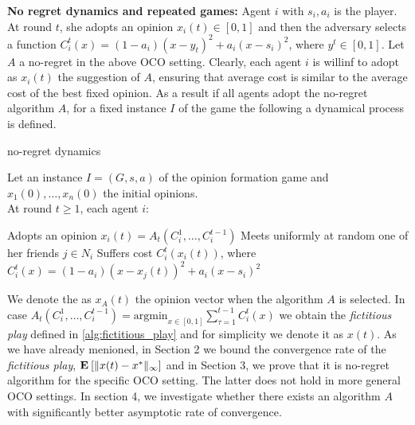 \noindent \textbf{No regret dynamics and repeated games:}
\noindent Agent $i$ with $s_i,a_i$ is the player. At round $t$, she adopts an opinion $x_i(t) \in [0,1]$ and then the adversary selects a function $C_i^t(x)=(1-a_i)(x-y_t)^2 + a_i(x-s_i)^2$, where $y^t\in [0,1]$.
Let $A$ a no-regret in the above OCO setting. Clearly, each agent $i$ is willinf to adopt as $x_i(t)$ the suggestion of $A$, ensuring that average cost is similar
to the average cost of the best fixed opinion. As a result if all agents adopt the no-regret algorithm $A$, for a fixed instance $I$ of the game the following a dynamical process
is defined.
\begin{algorithm}
  \caption{no-regret dynamics}
  \label{alg:fno_regret_dynamics}
      Let an instance $I=(G,s,a)$ of the opinion formation game and $x_1(0),\ldots,x_n(0)$ the initial opinions.\\
      At round $t\geq 1$, each agent $i$:
  \begin{algorithmic}[1]
    \State Adopts an opinion $x_i(t)=A_t(C_i^1,\ldots,C_i^{t-1})$
    \State Meets uniformly at random one of her friends $j \in N_i$
    \State Suffers cost $C^t_i(x_i(t))$, where $C^t_i(x) = (1-a_i)(x-x_j(t))^2 + a_i(x-s_i)^2$
\end{algorithmic}
\end{algorithm}

\noindent We denote the as $x_A(t)$ the opinion vector when the algorithm $A$ is selected. In case $A_t(C_i^1,\ldots,C_i^{t-1})= \text{argmin}_{x \in [0,1]}\sum_{\tau=1}^{t-1}C_i^t(x)$ 
we obtain the \emph{fictitious play} defined in \ref{alg:fictitious_play} and for simplicity we denote it as $x(t)$. As we have already menioned, in Section 2 we
bound the convergence rate of the \emph{fictitious play}, $\Exp{\norm{\infty}{x(t)-x^*}}$ and in Section 3, we prove that it is no-regret algorithm for the specific OCO setting. The latter
does not hold in more general OCO settings. In section 4, we investigate whether there exists an algorithm $A$ with significantly better asymptotic rate of convergence. 


